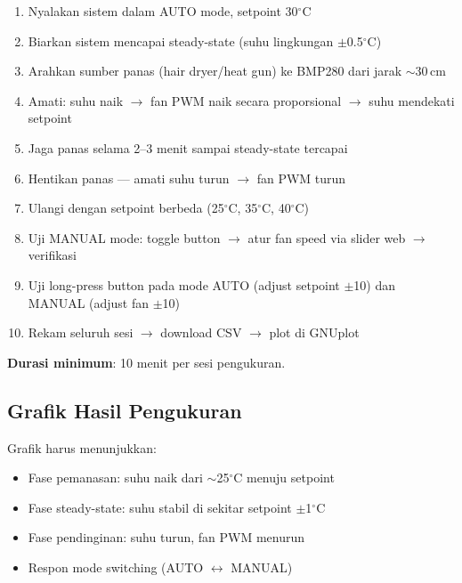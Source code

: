 \documentclass[11pt,a4paper]{article}
\begin{document}
\begin{enumerate}
    \item Nyalakan sistem dalam AUTO mode, setpoint 30$^{\circ}$C
    \item Biarkan sistem mencapai steady-state (suhu lingkungan $\pm$0.5$^{\circ}$C)
    \item Arahkan sumber panas (hair dryer/heat gun) ke BMP280 dari jarak $\sim$30\,cm
    \item Amati: suhu naik $\rightarrow$ fan PWM naik secara proporsional $\rightarrow$ suhu mendekati setpoint
    \item Jaga panas selama 2--3 menit sampai steady-state tercapai
    \item Hentikan panas --- amati suhu turun $\rightarrow$ fan PWM turun
    \item Ulangi dengan setpoint berbeda (25$^{\circ}$C, 35$^{\circ}$C, 40$^{\circ}$C)
    \item Uji MANUAL mode: toggle button $\rightarrow$ atur fan speed via slider web $\rightarrow$ verifikasi
    \item Uji long-press button pada mode AUTO (adjust setpoint $\pm$10) dan MANUAL (adjust fan $\pm$10)
    \item Rekam seluruh sesi $\rightarrow$ download CSV $\rightarrow$ plot di GNUplot
\end{enumerate}

\textbf{Durasi minimum}: 10 menit per sesi pengukuran.

\subsection{Grafik Hasil Pengukuran}

\begin{center}
\end{center}

\begin{center}
\end{center}

Grafik harus menunjukkan:
\begin{itemize}
    \item Fase pemanasan: suhu naik dari $\sim$25$^{\circ}$C menuju setpoint
    \item Fase steady-state: suhu stabil di sekitar setpoint $\pm$1$^{\circ}$C
    \item Fase pendinginan: suhu turun, fan PWM menurun
    \item Respon mode switching (AUTO $\leftrightarrow$ MANUAL)
\end{itemize}
\end{document}
